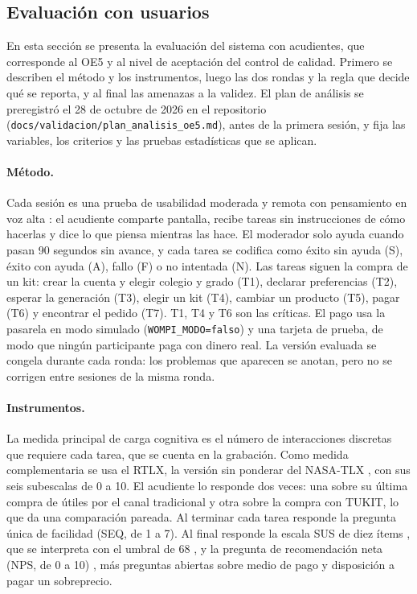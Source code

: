 \subsection{Evaluación con usuarios}
\label{sec:oe5}

En esta sección se presenta la evaluación del sistema con acudientes, que corresponde al OE5 y al
nivel de aceptación del control de calidad. Primero se describen el método y los instrumentos,
luego las dos rondas y la regla que decide qué se reporta, y al final las amenazas a la validez.
El plan de análisis se preregistró el 28 de octubre de 2026 en el repositorio
(\texttt{docs/validacion/plan\_analisis\_oe5.md}), antes de la primera sesión, y fija las
variables, los criterios y las pruebas estadísticas que se aplican.

\paragraph{Método.} Cada sesión es una prueba de usabilidad moderada y remota con pensamiento en voz
alta \citep{lazar_research_2017}: el acudiente comparte pantalla, recibe tareas sin instrucciones de
cómo hacerlas y dice lo que piensa mientras las hace. El moderador solo ayuda cuando pasan 90
segundos sin avance, y cada tarea se codifica como éxito sin ayuda (S), éxito con ayuda (A), fallo
(F) o no intentada (N). Las tareas siguen la compra de un kit: crear la cuenta y elegir colegio y
grado (T1), declarar preferencias (T2), esperar la generación (T3), elegir un kit (T4), cambiar un
producto (T5), pagar (T6) y encontrar el pedido (T7). T1, T4 y T6 son las críticas. El pago usa la
pasarela en modo simulado (\texttt{WOMPI\_MODO=falso}) y una tarjeta de prueba, de modo que ningún
participante paga con dinero real. La versión evaluada se congela durante cada ronda: los problemas
que aparecen se anotan, pero no se corrigen entre sesiones de la misma ronda.

\paragraph{Instrumentos.} La medida principal de carga cognitiva es el número de interacciones
discretas que requiere cada tarea, que se cuenta en la grabación. Como medida complementaria se usa
el RTLX, la versión sin ponderar del NASA-TLX \citep{hart_development_1988,hart_nasa_2006}, con sus
seis subescalas de 0 a 10. El acudiente lo responde dos veces: una sobre su última compra de útiles
por el canal tradicional y otra sobre la compra con TUKIT, lo que da una comparación pareada. Al
terminar cada tarea responde la pregunta única de facilidad (SEQ, de 1 a 7). Al final responde la
escala SUS de diez ítems \citep{brooke_sus_1996}, que se interpreta con el umbral de 68
\citep{bangor_empirical_2008}, y la pregunta de recomendación neta (NPS, de 0 a 10)
\citep{reichheld_one_2003}, más preguntas abiertas sobre medio de pago y disposición a pagar un
sobreprecio.

